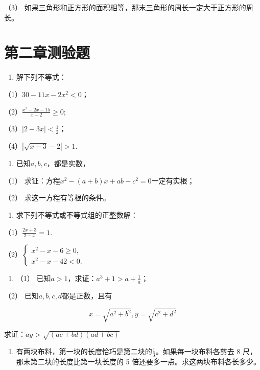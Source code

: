 （3）
如果三角形和正方形的面积相等，那末三角形的周长一定大于正方形的周长。

\section{第二章测验题}

\begin{enumerate}
\item
  解下列不等式：
\end{enumerate}

（1）\(30 - 11x - 2x^2 < 0\)；

（2）\(\frac{x^2 - 2x - 15}{x - 2} \geqslant 0;\)

（3）\(|2 - 3x| < \frac{1}{2}\)；

（4）\(|\sqrt{x - 3} - 2| > 1.\)

\begin{enumerate}[start=2]
\item
  已知\(a, b, c\)，都是实数，
\end{enumerate}

（1） 求证：方程\(x^{2}-(a+b)x+ab-c^{2}=0\)一定有实根；

（2） 求这一方程有等根的条件。

\begin{enumerate}[start=3]
\item
  求下列不等式或不等式组的正整数解：
\end{enumerate}

（1）\(\frac{2x + 3}{2 - x} = 1.\)

（2）\(\left\{ \begin{array}{l} x^{2} - x - 6 \geqslant 0, \\ x^{2} - x - 42 < 0. \end{array} \right.\)

\begin{enumerate}[start=4]
\item
  （1） 已知\(a > 1\)，求证：\(a^3 + 1 > a + \frac{1}{a}\)；
\end{enumerate}

（2） 已知\(a, b, c, d\)都是正数，且有

\[
x = \sqrt{a^{2} + b^{2}}, y = \sqrt{c^{2} + d^{2}}
\]

求证：\(ay > \sqrt{(ac + bd)(ad + bc)}\)

\begin{enumerate}[start=6]
\item
  有两块布料，第一块的长度恰巧是第二块的\(\frac{1}{3}\)。如果每一块布料各剪去
  8 尺，那末第二块的长度比第一块长度的 5
  倍还要多一点。求这两块布料各长多少。
\end{enumerate}

